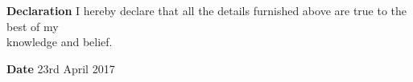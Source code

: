 \documentclass{article}
\begin{document}
	         
	      \begin{flushleft}
	      	\vspace{0.2in}
	      	\textbf{Declaration} \hspace{0.60in}  I hereby declare that all the details furnished above are true to the best of
	      	my\\\hspace{3.7cm} knowledge and belief.
	      \end{flushleft}
      
      \begin{flushleft}
      	\vspace{0.28in}
      	\textbf{Date} \hspace{1.05 in} 23rd April 2017
      \end{flushleft}
	      
\end{document}
